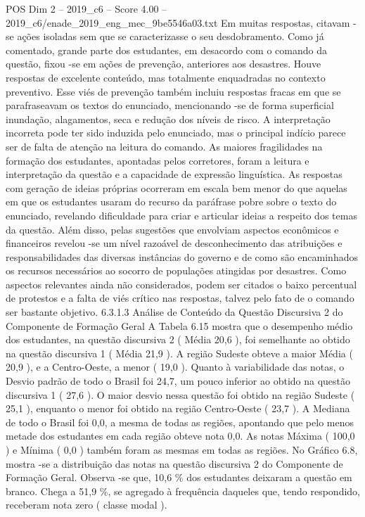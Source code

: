 \begin{textsample}{POS Dim 2 – 2019\_c6 – Score 4.00 – 2019\_c6/enade\_2019\_eng\_mec\_9be5546a03.txt}
Em muitas respostas, citavam -se ações isoladas sem que se caracterizasse o seu desdobramento.
Como já comentado, grande parte dos estudantes, em desacordo com o comando da questão, fixou -se em ações de prevenção, anteriores aos desastres.
Houve respostas de excelente conteúdo, mas totalmente enquadradas no contexto preventivo.
Esse viés de prevenção também incluiu respostas fracas em que se parafraseavam os textos do enunciado, mencionando -se de forma superficial inundação, alagamentos, seca e redução dos níveis de risco.
A interpretação incorreta pode ter sido induzida pelo enunciado, mas o principal indício parece ser de falta de atenção na leitura do comando.
As maiores fragilidades na formação dos estudantes, apontadas pelos corretores, foram a leitura e interpretação da questão e a capacidade de expressão linguística.
As respostas com geração de ideias próprias ocorreram em escala bem menor do que aquelas em que os estudantes usaram do recurso da paráfrase pobre sobre o texto do enunciado, revelando dificuldade para criar e articular ideias a respeito dos temas da questão.
Além disso, pelas sugestões que envolviam aspectos econômicos e financeiros revelou -se um nível razoável de desconhecimento das atribuições e responsabilidades das diversas instâncias do governo e de como são encaminhados os recursos necessários ao socorro de populações atingidas por desastres.
Como aspectos relevantes ainda não considerados, podem ser citados o baixo percentual de protestos e a falta de viés crítico nas respostas, talvez pelo fato de o comando ser bastante objetivo. 6.3.1.3 Análise de Conteúdo da Questão Discursiva 2 do Componente de Formação Geral A Tabela 6.15 mostra que o desempenho médio dos estudantes, na questão discursiva 2 ( Média 20,6 ), foi semelhante ao obtido na questão discursiva 1 ( Média 21,9 ).
A região Sudeste obteve a maior Média ( 20,9 ), e a Centro-Oeste, a menor ( 19,0 ).
Quanto à variabilidade das notas, o Desvio padrão de todo o Brasil foi 24,7, um pouco inferior ao obtido na questão discursiva 1 ( 27,6 ).
O maior desvio nessa questão foi obtido na região Sudeste ( 25,1 ), enquanto o menor foi obtido na região Centro-Oeste ( 23,7 ).
A Mediana de todo o Brasil foi 0,0, a mesma de todas as regiões, apontando que pelo menos metade dos estudantes em cada região obteve nota 0,0.
As notas Máxima ( 100,0 ) e Mínima ( 0,0 ) também foram as mesmas em todas as regiões.
No Gráfico 6.8, mostra -se a distribuição das notas na questão discursiva 2 do Componente de Formação Geral.
Observa -se que, 10,6 \% dos estudantes deixaram a questão em branco.
Chega a 51,9 \%, se agregado à frequência daqueles que, tendo respondido, receberam nota zero ( classe modal ).

\end{textsample}
